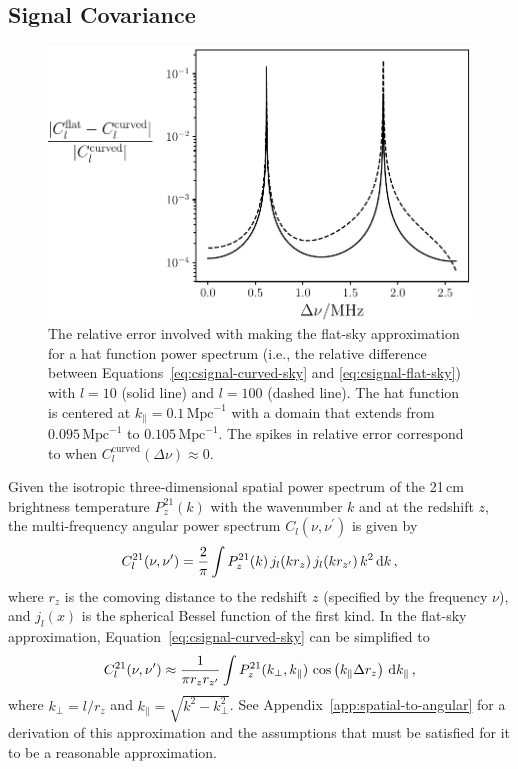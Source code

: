 \documentclass[twocolumn]{aastex62}
\renewcommand{\d}{{\rm d}}
\begin{document}
\subsection{Signal Covariance}\label{sec:signal-covariance}

\begin{figure}[t]
    \centering
    \includegraphics[width=\columnwidth]{flat-sky-approximation}
    \caption{
        The relative error involved with making the flat-sky approximation for a hat function power
        spectrum (i.e., the relative difference between Equations~\ref{eq:csignal-curved-sky} and
        \ref{eq:csignal-flat-sky}) with $l=10$ (solid line) and $l=100$ (dashed line). The hat
        function is centered at $k_\parallel=0.1\,\text{Mpc}^{-1}$ with a domain that extends from
        $0.095\,\text{Mpc}^{-1}$ to $0.105\,\text{Mpc}^{-1}$. The spikes in relative error
        correspond to when $C_l^\text{curved}(\Delta\nu) \approx 0$.
    }
    \label{fig:flat-sky-approximation}
\end{figure}

Given the isotropic three-dimensional spatial power spectrum of the 21\,cm brightness temperature
$P^{21}_z(k)$ with the wavenumber $k$ and at the redshift $z$, the multi-frequency angular
power spectrum $C_l(\nu, \nu^\prime)$ is given by
\begin{equation}\label{eq:csignal-curved-sky}
    C^{21}_l(\nu, \nu^\prime) =
        \frac{2}{\pi}
        \int
        P_z^{21}(k) \,
        j_l(k r_z) \,
        j_l(k r_{z^\prime}) \,
        k^2 \, \d k\,,
\end{equation}
where $r_z$ is the comoving distance to the redshift $z$ (specified by the frequency $\nu$), and
$j_l(x)$ is the spherical Bessel function of the first kind. In the flat-sky approximation,
Equation~\ref{eq:csignal-curved-sky} can be simplified to
\begin{equation}\label{eq:csignal-flat-sky}
    C^{21}_l(\nu, \nu^\prime) \approx
        \frac{1}{\pi r_z r_{z^\prime}}
        \int
        P_z^{21}(k_\perp, k_\parallel) \,
        \cos\left(k_\parallel \Delta r_z\right)
        \, \d k_\parallel\,,
\end{equation}
where $k_\perp = l/r_z$ and $k_\parallel = \sqrt{k^2-k_\perp^2}$.  See
Appendix~\ref{app:spatial-to-angular} for a derivation of this approximation and the assumptions
that must be satisfied for it to be a reasonable approximation.
\end{document}
